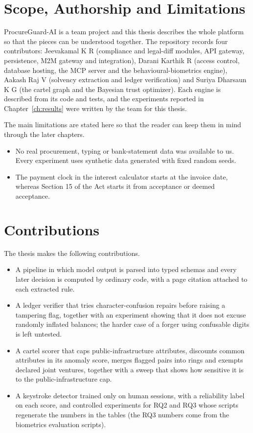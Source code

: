 \section{Scope, Authorship and Limitations}
\label{sec:scope}
ProcureGuard-AI is a team project and this thesis describes the whole platform so that the pieces can be understood together. The repository records four contributors: Jeevakamal K R (compliance and legal-diff modules, API gateway, persistence, M2M gateway and integration), Darani Karthik R (access control, database hosting, the MCP server and the behavioural-biometrics engine), Aakash Raj V (solvency extraction and ledger verification) and Suriya Dharsaun K G (the cartel graph and the Bayesian trust optimizer). Each engine is described from its code and tests, and the experiments reported in Chapter~\ref{ch:results} were written by the team for this thesis.

The main limitations are stated here so that the reader can keep them in mind through the later chapters.
\begin{itemize}
    \item No real procurement, typing or bank-statement data was available to us. Every experiment uses synthetic data generated with fixed random seeds.
    \item The payment clock in the interest calculator starts at the invoice date, whereas Section 15 of the Act starts it from acceptance or deemed acceptance.
\end{itemize}

\section{Contributions}
The thesis makes the following contributions.
\begin{itemize}
    \item A pipeline in which model output is parsed into typed schemas and every later decision is computed by ordinary code, with a page citation attached to each extracted rule.
    \item A ledger verifier that tries character-confusion repairs before raising a tampering flag, together with an experiment showing that it does not excuse randomly inflated balances; the harder case of a forger using confusable digits is left untested.
    \item A cartel scorer that caps public-infrastructure attributes, discounts common attributes in its anomaly score, merges flagged pairs into rings and exempts declared joint ventures, together with a sweep that shows how sensitive it is to the public-infrastructure cap.
    \item A keystroke detector trained only on human sessions, with a reliability label on each score, and controlled experiments for RQ2 and RQ3 whose scripts regenerate the numbers in the tables (the RQ3 numbers come from the biometrics evaluation scripts).
\end{itemize}

